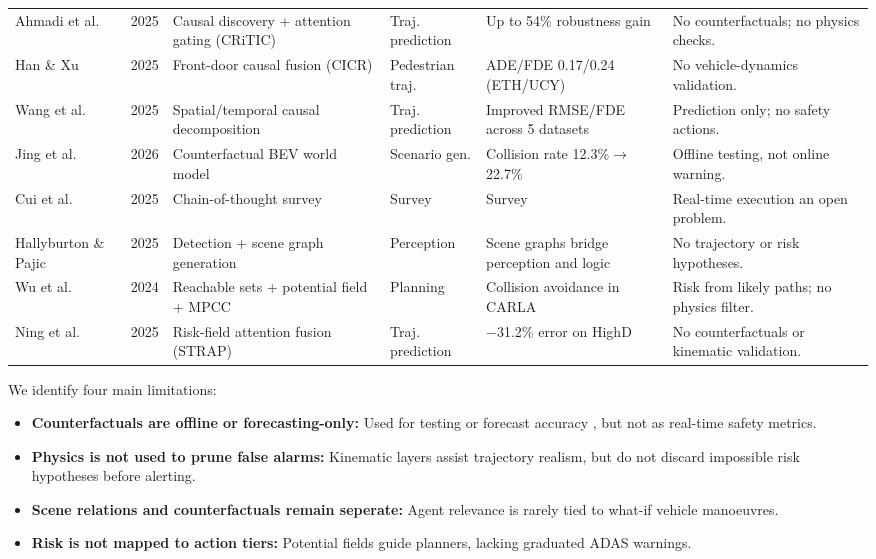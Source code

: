 \documentclass[preprint,12pt]{elsarticle}
\begin{document}
\begin{table}[H]
{\begin{tabular}{l c L{4.0cm} l L{4.0cm} L{5.0cm}}
Ahmadi et al. \cite{ahmadi2025critic} & 2025 & Causal discovery + attention gating (CRiTIC) & Traj. prediction & Up to 54\% robustness gain & No counterfactuals; no physics checks. \\
Han \& Xu \cite{han2025cicr} & 2025 & Front-door causal fusion (CICR) & Pedestrian traj. & ADE/FDE 0.17/0.24 (ETH/UCY) & No vehicle-dynamics validation. \\
Wang et al. \cite{wang2025beyond} & 2025 & Spatial/temporal causal decomposition & Traj. prediction & Improved RMSE/FDE across 5 datasets & Prediction only; no safety actions. \\
Jing et al. \cite{jing2026counterscene} & 2026 & Counterfactual BEV world model & Scenario gen. & Collision rate 12.3\%$\rightarrow$22.7\% & Offline testing, not online warning. \\
Cui et al. \cite{cui2025cot} & 2025 & Chain-of-thought survey & Survey & Survey & Real-time execution an open problem. \\
Hallyburton \& Pajic \cite{hallyburton2025neuspaper} & 2025 & Detection + scene graph generation & Perception & Scene graphs bridge perception and logic & No trajectory or risk hypotheses. \\
Wu et al. \cite{wu2024riskfield} & 2024 & Reachable sets + potential field + MPCC & Planning & Collision avoidance in CARLA & Risk from likely paths; no physics filter. \\
Ning et al. \cite{ning2025strap} & 2025 & Risk-field attention fusion (STRAP) & Traj. prediction & $-$31.2\% error on HighD & No counterfactuals or kinematic validation. \\
\hline
\end{tabular}
}
\end{table}

We identify four main limitations:
\begin{itemize}
    \item \textbf{Counterfactuals are offline or forecasting-only:} Used for testing \cite{jing2026counterscene} or forecast accuracy \cite{han2025cicr}, but not as real-time safety metrics.
    \item \textbf{Physics is not used to prune false alarms:} Kinematic layers \cite{liao2024physics, baden2025tpk, chugh2025xtrack} assist trajectory realism, but do not discard impossible risk hypotheses before alerting.
    \item \textbf{Scene relations and counterfactuals remain seperate:} Agent relevance \cite{ahmadi2025critic} is rarely tied to what-if vehicle manoeuvres.
    \item \textbf{Risk is not mapped to action tiers:} Potential fields \cite{wu2024riskfield, ning2025strap} guide planners, lacking graduated ADAS warnings.
\end{itemize}
\end{document}
